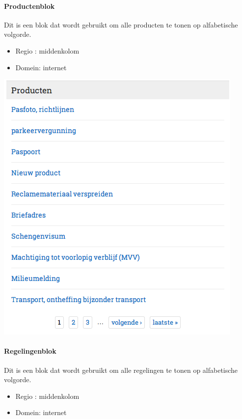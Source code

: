 \paragraph{Productenblok}

Dit is een blok dat wordt gebruikt om alle producten te tonen op alfabetische volgorde.

\begin{itemize}
\item Regio : middenkolom
\item Domein: internet
\end{itemize}

\begin{center}
	\includegraphics[scale=0.5]{img/blokken/producten.png}
\end{center}

\paragraph{Regelingenblok}

Dit is een blok dat wordt gebruikt om alle regelingen te tonen op alfabetische volgorde.

\begin{itemize}
\item Regio : middenkolom
\item Domein: internet
\end{itemize}

